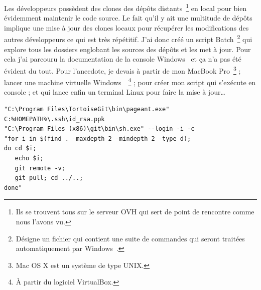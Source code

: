 Les développeurs possèdent des clones des dépôts distants\,
\footnote{Ils se trouvent tous sur le serveur OVH qui sert de point de
rencontre comme nous l'avons vu.} en local pour bien évidemment
maintenir le code source. Le fait qu'il y ait une multitude de dépôts
implique une mise à jour des clones locaux pour récupérer les
modifications des autres développeurs ce qui est très répétitif. J'ai
donc créé un script Batch\, \footnote{Désigne un fichier qui contient
une suite de commandes qui seront traitées automatiquement par
Windows~\textregistered.} qui explore tous les dossiers englobant les
sources des dépôts et les met à jour. Pour cela j'ai parcouru la
documentation de la console Windows~\textregistered{} et ça n'a pas été
évident du tout. Pour l'anecdote, je devais à partir de mon MacBook
Pro\, \footnote{Mac OS X est un système de type UNIX.} ; lancer une
machine virtuelle Windows~\textregistered\, \footnote{À partir du
logiciel VirtualBox.} ; pour créer mon script qui s'exécute en console ;
et qui lance enfin un terminal Linux pour faire la mise à jour\dots\\

\begin{lstlisting}[basicstyle=\ttfamily\small, frame=trBL]
"C:\Program Files\TortoiseGit\bin\pageant.exe"
C:%HOMEPATH%\.ssh\id_rsa.ppk
"C:\Program Files (x86)\git\bin\sh.exe" --login -i -c
"for i in $(find . -maxdepth 2 -mindepth 2 -type d);
do cd $i;
   echo $i;
   git remote -v;
   git pull; cd ../..;
done"
\end{lstlisting}
